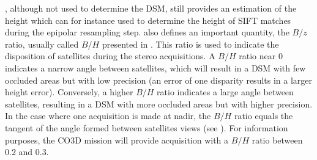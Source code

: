 \begin{remark}
    , although not used to determine the DSM, still provides an estimation of the height which can for instance used to determine the height of SIFT matches during the epipolar resampling step.  also defines an important quantity, the $B/z$ ratio, usually called $B/H$ presented in . This ratio is used to indicate the disposition of satellites during the stereo acquisitions. A $B/H$ ratio near $0$ indicates a narrow angle between satellites, which will result in a DSM with few occluded areas but with low precision (an error of one disparity results in a larger height error). Conversely, a higher $B/H$ ratio indicates a large angle between satellites, resulting in a DSM with more occluded areas but with higher precision. In the case where one acquisition is made at nadir, the $B/H$ ratio equals the tangent of the angle formed between satellites views (see ). For information purposes, the CO3D mission will provide acquisition with a $B/H$ ratio between $0.2$ and $0.3$.
\end{remark}

